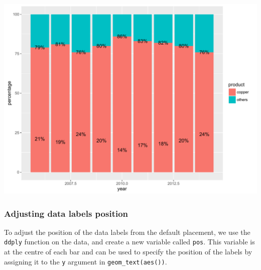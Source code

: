 \documentclass[]{article}
\newenvironment{Shaded}{\begin{snugshade}}{\end{snugshade}}
\newcommand{\KeywordTok}[1]{\textcolor[rgb]{0.13,0.29,0.53}{\textbf{{#1}}}}
\newcommand{\DataTypeTok}[1]{\textcolor[rgb]{0.13,0.29,0.53}{{#1}}}
\newcommand{\DecValTok}[1]{\textcolor[rgb]{0.00,0.00,0.81}{{#1}}}
\newcommand{\FloatTok}[1]{\textcolor[rgb]{0.00,0.00,0.81}{{#1}}}
\newcommand{\StringTok}[1]{\textcolor[rgb]{0.31,0.60,0.02}{{#1}}}
\newcommand{\NormalTok}[1]{{#1}}
\begin{document}
\begin{center}\includegraphics{0_all_posts_pdf/stacked_2-1} \end{center}

\subsubsection{Adjusting data labels
position}\label{adjusting-data-labels-position-1}

To adjust the position of the data labels from the default placement, we
use the \texttt{ddply} function on the data, and create a new variable
called \texttt{pos}. This variable is at the centre of each bar and can
be used to specify the position of the labels by assigning it to the
\texttt{y} argument in \texttt{geom\_text(aes())}.

\begin{Shaded}
\end{Shaded}
\end{document}
